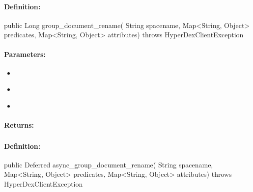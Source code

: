 \paragraph{Definition:}
\begin{javacode}
public Long group_document_rename(
        String spacename,
        Map<String, Object> predicates,
        Map<String, Object> attributes) throws HyperDexClientException
\end{javacode}

\paragraph{Parameters:}
\begin{itemize}[noitemsep]
\item {}\\

\item {}\\

\item {}\\

\end{itemize}

\paragraph{Returns:}


\pagebreak
\subsubsection{}
\label{api:java:async_group_document_rename}


\paragraph{Definition:}
\begin{javacode}
public Deferred async_group_document_rename(
        String spacename,
        Map<String, Object> predicates,
        Map<String, Object> attributes) throws HyperDexClientException
\end{javacode}

